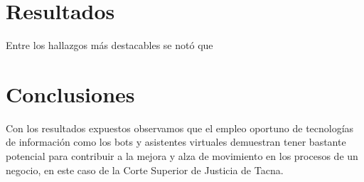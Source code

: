 \documentclass[twoside,twocolumn]{article}
\begin{document}
\section{Resultados}

Entre los hallazgos más destacables se notó que 

\section{Conclusiones}
Con los resultados expuestos observamos que el empleo oportuno de tecnologías de información como los bots y asistentes virtuales demuestran tener bastante potencial para contribuir a la mejora y alza de movimiento en los procesos de un negocio, en este caso de la Corte Superior de Justicia de Tacna.
\end{document}
